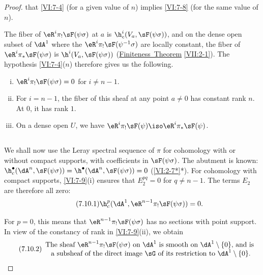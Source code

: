 \begin{proof}[Proof]
that \ref{VI:7-4} (for a given value of $n$) implies \ref{VI:7-8} 
(for the same value of $n$). 

The fiber of $\eR^i \pi_! \sF(\psi\sigma)$ at $a$ is 
$\h_c^i(V_a,\sF(\psi\sigma))$, and on the dense open subset of $\dA^1$ where the 
  $\eR^i \pi_!\sF(\psi^{-1}\sigma)$ are locally constant, the fiber of 
$\eR^i \pi_\ast \sF(\psi\sigma)$ is $\h^i(V_a,\sF(\psi\sigma))$ 
(\hyperref[VII]{Finiteness\ Theorem} \ref{VII:2-1}). The hypothesis \ref{VI:7-4}($n$) 
therefore gives us the following. 





\begin{lemma_}\label{VI:7-9}
\begin{enumerate}[(i)]
  \item $\eR^i \pi_! \sF(\psi\sigma)=0$ for $i\ne n-1$. 
  \item For $i=n-1$, the fiber of this sheaf at any point $a\ne 0$ has 
    constant rank $n$. At $0$, it has rank $1$. 
  \item On a dense open $U$, we have 
    $\eR^i \pi_! \sF(\psi) \iso \eR^i \pi_\ast \sF(\psi)$. 
\end{enumerate}
\end{lemma_}





\subsection{}\label{VI:7-10}

We shall now use the Leray spectral sequence of $\pi$ for 
cohomology with or without compact supports, with coefficients in $\sF(\psi\sigma)$. 
The abutment is known: 
$\h_c^\bullet(\dA^n,\sF(\psi\sigma))=\h^\bullet(\dA^n,\sF(\psi\sigma)) = 0$ 
(\ref{VI:2-7*}*). For cohomology with compact supports, \ref{VI:7-9}(i) ensures that 
$E_2^{pq}=0$ for $q\ne n-1$. The terms $E_2$ are therefore all zero: 
\begin{equation*}\tag{7.10.1}\label{VI:eq:7-10-1}
  \h_c^p(\dA^1,\eR^{n-1} \pi_!\sF(\psi\sigma)) = 0 \text{.} 
\end{equation*}

  For $p=0$, this means that $\eR^{n-1}\pi_! \sF(\psi\sigma)$ has no sections 
with point support. In view of the constancy of rank in \ref{VI:7-9}(ii), we obtain 
\begin{equation*}\tag{7.10.2}\label{VI:eq:7-10-2}
  \begin{array}{c}
    \text{The sheaf $\eR^{n-1} \pi_! \sF(\psi\sigma)$ on $\dA^1$ is smooth on $\dA^1\setminus \{0\}$, and is } \\ 
    \text{a subsheaf of the direct image $\sG$ of its restriction to $\dA^1\setminus \{0\}$.}
  \end{array}
\end{equation*}


\end{proof}
